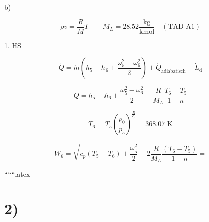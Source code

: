 b)

\[
\rho v = \frac{R}{M} T \quad \quad M_L = 28.52 \frac{\text{kg}}{\text{kmol}} \quad (\text{TAD A1})
\]

1. HS

\[
\dot{Q} = \dot{m} (h_5 - h_6 + \frac{\omega_5^2 - \omega_6^2}{2}) + \dot{Q}_{\text{adiabatisch}} - \dot{L}_{\text{d}}
\]

\[
\dot{Q} = h_5 - h_6 + \frac{\omega_5^2 - \omega_6^2}{2} - \frac{R}{M_L} \frac{T_6 - T_5}{1 - n}
\]

\[
T_6 = T_5 \left(\frac{p_0}{p_5}\right)^{\frac{R}{c_p}} = 368.07 \text{ K}
\]

\[
\dot{W}_6 = \sqrt{c_p (T_5 - T_6) + \frac{\omega_5^2}{2}} - 2 \frac{R}{M_L} \frac{(T_6 - T_5)}{1 - n} = 
\]

``````latex

\section*{2)}